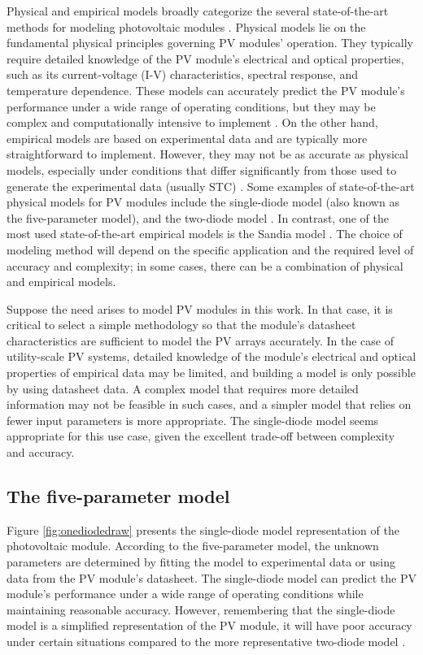 Physical and empirical models broadly categorize the several state-of-the-art methods for modeling photovoltaic modules \cite{Braun2011}. Physical models lie on the fundamental physical principles governing PV modules' operation. They typically require detailed knowledge of the PV module's electrical and optical properties, such as its current-voltage (I-V) characteristics, spectral response, and temperature dependence. These models can accurately predict the PV module's performance under a wide range of operating conditions, but they may be complex and computationally intensive to implement \cite{Kumar2019}. On the other hand, empirical models are based on experimental data and are typically more straightforward to implement. However, they may not be as accurate as physical models, especially under conditions that differ significantly from those used to generate the experimental data (usually STC) \cite{Braun2011}. Some examples of state-of-the-art physical models for PV modules include the single-diode model (also known as the five-parameter model), and the two-diode model \cite{Godina2017}. In contrast, one of the most used state-of-the-art empirical models is the Sandia model \cite{Braun2011}. The choice of modeling method will depend on the specific application and the required level of accuracy and complexity; in some cases, there can be a combination of physical and empirical models.

Suppose the need arises to model PV modules in this work. In that case, it is critical to select a simple methodology so that the module's datasheet characteristics are sufficient to model the PV arrays accurately. In the case of utility-scale PV systems, detailed knowledge of the module's electrical and optical properties of empirical data may be limited, and building a model is only possible by using datasheet data. A complex model that requires more detailed information may not be feasible in such cases, and a simpler model that relies on fewer input parameters is more appropriate. The single-diode model seems appropriate for this use case, given the excellent trade-off between complexity and accuracy.

\subsection{The five-parameter model}

Figure \ref{fig:onediodedraw} presents the single-diode model representation of the photovoltaic module. According to the five-parameter model, the unknown parameters are determined by fitting the model to experimental data or using data from the PV module's datasheet. The single-diode model can predict the PV module's performance under a wide range of operating conditions while maintaining reasonable accuracy. However, remembering that the single-diode model is a simplified representation of the PV module, it will have poor accuracy under certain situations compared to the more representative two-diode model \cite{Godina2017}.

